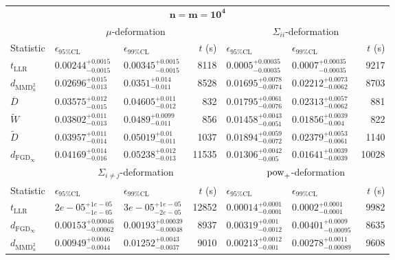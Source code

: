 \begin{tabular}{l|llr|llr}
	\toprule
	\multicolumn{7}{c}{$\mathbf{n=m=10^{4}}$} \\
	\multicolumn{1}{c}{} & \multicolumn{3}{c}{$\mu$-deformation} & \multicolumn{3}{c}{$\Sigma_{ii}$-deformation} \\
	Statistic & $\epsilon_{95\%\mathrm{CL}}$ & $\epsilon_{99\%\mathrm{CL}}$ & $t$ (s) & $\epsilon_{95\%\mathrm{CL}}$ & $\epsilon_{99\%\mathrm{CL}}$ & $t$ (s) \\
	\midrule
	$t_{\mathrm{LLR}}$ & $0.00244_{-0.0015}^{+0.0015}$ & $0.00345_{-0.0015}^{+0.0015}$ & 8118 & $0.0005_{-0.00035}^{+0.00035}$ & $0.0007_{-0.00035}^{+0.00035}$ & 9217 \\
	$d_{\mathrm{MMD}^{2}_{u}}$ & $0.02696_{-0.013}^{+0.015}$ & $0.0351_{-0.011}^{+0.014}$ & 8528 & $0.01695_{-0.0074}^{+0.0078}$ & $0.02212_{-0.0062}^{+0.0073}$ & 8703 \\
	$\overline{D}$ & $0.03575_{-0.015}^{+0.012}$ & $0.04605_{-0.012}^{+0.011}$ & 832 & $0.01795_{-0.0076}^{+0.0061}$ & $0.02313_{-0.0062}^{+0.0057}$ & 881 \\
	$\widetilde{W}$ & $0.03802_{-0.013}^{+0.011}$ & $0.0489_{-0.011}^{+0.0099}$ & 856 & $0.01458_{-0.0051}^{+0.0043}$ & $0.01856_{-0.004}^{+0.0039}$ & 822 \\
	$\widetilde{D}$ & $0.03957_{-0.014}^{+0.011}$ & $0.05019_{-0.011}^{+0.01}$ & 1037 & $0.01894_{-0.0072}^{+0.0059}$ & $0.02379_{-0.0061}^{+0.0053}$ & 1140 \\
	$d_{\mathrm{FGD}_{\infty}}$ & $0.04169_{-0.016}^{+0.014}$ & $0.05238_{-0.013}^{+0.012}$ & 11535 & $0.01306_{-0.005}^{+0.0042}$ & $0.01641_{-0.0039}^{+0.0039}$ & 10028 \\
	\toprule
	\multicolumn{1}{c}{} & \multicolumn{3}{c}{$\Sigma_{i\neq j}$-deformation} & \multicolumn{3}{c}{$\rm{pow}_{+}$-deformation} \\
	Statistic & $\epsilon_{95\%\mathrm{CL}}$ & $\epsilon_{99\%\mathrm{CL}}$ & $t$ (s) & $\epsilon_{95\%\mathrm{CL}}$ & $\epsilon_{99\%\mathrm{CL}}$ & $t$ (s) \\
	\midrule
	$t_{\mathrm{LLR}}$ & $2e-05_{-1e-05}^{+1e-05}$ & $3e-05_{-2e-05}^{+1e-05}$ & 12852 & $0.00014_{-0.0001}^{+0.0001}$ & $0.0002_{-0.0001}^{+0.0001}$ & 9982 \\
	$d_{\mathrm{FGD}_{\infty}}$ & $0.00153_{-0.00062}^{+0.00046}$ & $0.00193_{-0.00048}^{+0.00039}$ & 8937 & $0.00319_{-0.0012}^{+0.001}$ & $0.00401_{-0.00095}^{+0.0009}$ & 8635 \\
	$d_{\mathrm{MMD}^{2}_{u}}$ & $0.00949_{-0.0044}^{+0.0046}$ & $0.01252_{-0.0037}^{+0.0043}$ & 9010 & $0.00213_{-0.001}^{+0.0012}$ & $0.00278_{-0.00089}^{+0.0011}$ & 9608 \\

\end{tabular}
